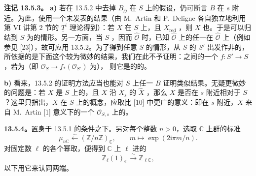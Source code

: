 \textbf{注记 13.5.3。}
\textbf{a)} 若在 13.5.2 中去掉 $B_{\widehat{\mathcal O}}$ 在 $S$ 上的假设，仍可断言 $B$ 在 $s$ 附近。为此，使用一个未发表的结果（由 M.~Artin 和 P.~Deligne 各自独立地利用第 VI 讲第 2 节的 $\underline T^i$ 理论得到）：若 $X$ 在 $S$ 上，且 $X_{\mathrm{red}}$ ，则 $X$ 也。于是可以归结到 $S$ 为的情形。另一方面，当 $S$ ，因而 $\widehat{\mathcal O}$ 时，已知 $\widehat{\mathcal O}$ 上的任一在 $\widehat{\mathcal O}$ 上（例如参见 [23]），故可应用 13.5.2。为了得到任意 $S$ 的情形，从 $S$ 的 $S'$ 出发作非的，所依据的是下面这个较为微妙的结果，我们在此不予证明：之间的一个 $f:S'\to S$，若为（即 $\mathcal O_S\to f_*(\mathcal O_{S'})$ 为），
则它是的的。

\textbf{b)} 看来，13.5.2 的证明方法应当也能对 $S$ 上任一 $B$ 证明类似结果。无疑更微妙的问题是：若 $X$ 是 $S$ 上的，且 $X$ 沿 $X_s$ 的 $\widehat X$ ，那么 $X$ 是否在 $s$ 附近相对于 $S$ ？这里只指出，$X$ 在 $S$ 上的概念，应取比 [10] 中更广的意义：即在 $s$ 附近，$X$ 来自 M.~Artin [1] 意义下的一个 $\mathcal O_{S,s}$ 上的。

\textbf{13.5.4。}置身于 13.5.1 的条件之下。另对每个整数 $n>0$，选取 $\mathbb C$ 上群的标准
\[
 \mu_{n\mathbb C}\xleftarrow{\sim}(\mathbb Z/n\mathbb Z)_{\mathbb C},
 \qquad m\longmapsto\exp(2\mathrm i\pi m/n).
\]
对固定数 $\ell$ 的各个幂取，便得到 $\mathbb C$ 上 $\ell$ 进的
\[
 \mathbb Z_\ell(1)_{\mathbb C}\xrightarrow{\sim}\mathbb Z_{\ell\mathbb C},
\]
以下用它来认同两端。


